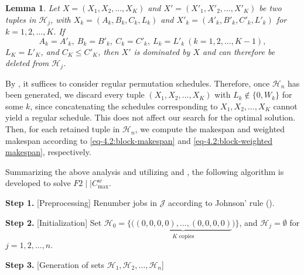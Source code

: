 ﻿\documentclass[12pt]{article} \textheight=24.5cm \textwidth=16.5cm \parskip = 0.165cm
\newtheorem{lemma}{Lemma}[section]
\begin{document}
\begin{sloppypar}
        \begin{lemma}\label{lem:dominance}
            Let $X=(X_1, X_2, \ldots, X_K)$ and $X'=(X'_1, X'_2, \ldots, X'_K)$ be two tuples
            in $\mathcal{H}_j$, with $X_k=(A_k, B_k, C_k, L_k)$ and $X'_k=(A'_k, B'_k, C'_k, L'_k)$ for $k=1, 2, \ldots, K$. If \begin{equation*}
                A_k = A'_k, ~ B_k = B'_k, ~ C_k=C'_k, ~ L_k = L'_k ~ (k=1, 2, \ldots, K-1),
            \end{equation*}
        $L_K = L'_K$, and $C_K \leq C'_K$, then $X'$ is dominated by $X$ and can therefore be deleted from $\mathcal{H}_j$.
        \end{lemma}

        By , it suffices to consider regular permutation schedules.
        Therefore, once $\mathcal{H}_n$ has been generated, we discard every tuple $(X_1, X_2, \ldots, X_K)$ with $L_k \notin \{0, W_k\}$ for some $k$, since concatenating the schedules corresponding to $X_1, X_2, \ldots, X_K$ cannot yield a regular schedule.
        This does not affect our search for the optimal solution.
        Then, for each retained tuple in $\mathcal{H}_n$, we compute the makespan and weighted makespan according to \cref{eq-4.2:block-makespan} and \cref{eq-4.2:block-weighted makespan}, respectively.

        Summarizing the above analysis and utilizing  and , the following algorithm is developed to solve $F2 \mid \mid C_{\max}^w$.

        \begin{algorithm}[H]
            \small
            \linespread{1.2}\selectfont
            \SetAlgoLined
            \DontPrintSemicolon
            \caption{An exact DP algorithm for $F2 \mid \mid C_{\max}^w$} \label{alg:dp}
            \BlankLine
            \textbf{Step 1.} [Preprocessing] Renumber jobs in $\mathcal{J}$ according to Johnson' rule (). \;

            \textbf{Step 2.} [Initialization] Set $\mathcal{H}_0=\{\Big(\underbrace{(0,0,0,0),\ldots,(0,0,0,0)}_{K\text{ copies}}\Big)\}$, and $\mathcal{H}_j=\emptyset$ for $j=1, 2, \ldots, n$. \;

            \textbf{Step 3.} [Generation of sets $\mathcal{H}_1, \mathcal{H}_2, \ldots, \mathcal{H}_n$]


\end{algorithm}
\end{sloppypar}
\end{document}
